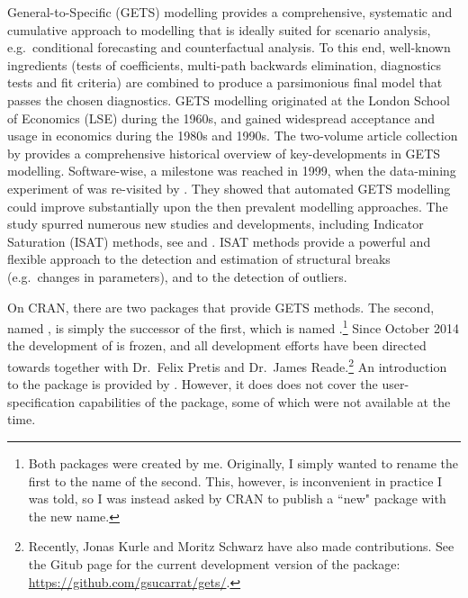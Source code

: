 General-to-Specific (GETS) modelling provides a comprehensive, systematic and cumulative approach to modelling that is ideally suited for scenario analysis, e.g.\ conditional forecasting and counterfactual analysis. To this end, well-known ingredients (tests of coefficients, multi-path backwards elimination, diagnostics tests and fit criteria) are combined to produce a parsimonious final model that passes the chosen diagnostics. GETS modelling originated at the London School of Economics (LSE) during the 1960s, and gained widespread acceptance and usage in economics during the 1980s and 1990s. The two-volume article collection by \citet{CamposEricssonHendry2005} provides a comprehensive historical overview of key-developments in GETS modelling. Software-wise, a milestone was reached in 1999, when the data-mining experiment of \citet{Lovell83} was re-visited by \citet{Hooveretal99}. They showed that automated GETS modelling could improve substantially upon the then prevalent modelling approaches. The study spurred numerous new studies and developments, including Indicator Saturation (ISAT) methods, see \citet{HendryJohansenSantos2008} and \citet{CastleDoornikHendryPretis2015}. ISAT methods provide a powerful and flexible approach to the detection and estimation of structural breaks (e.g.\ changes in parameters), and to the detection of outliers.

On CRAN, there are two packages that provide GETS methods. The second, named , is simply the successor of the first, which is named .\footnote{Both packages were created by me. Originally, I simply wanted to rename the first to the name of the second. This, however, is inconvenient in practice I was told, so I was instead asked by CRAN to publish a ``new" package with the new name.} Since October 2014 the development of  is frozen, and all development efforts have been directed towards  together with Dr.\ Felix Pretis and Dr.\ James Reade.\footnote{Recently, Jonas Kurle and Moritz Schwarz have also made contributions. See the Gitub page for the current development version of the package: \url{https://github.com/gsucarrat/gets/}.} An introduction to the  package is provided by \cite{PretisReadeSucarrat2018}. However, it does does not cover the user-specification capabilities of the package, some of which were not available at the time.

